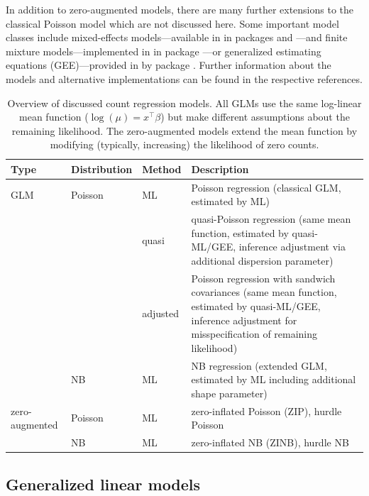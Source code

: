 \documentclass{Z}
\begin{document}
In addition to zero-augmented models, there are many further extensions to
the classical Poisson model which are not discussed here. Some important model
classes include mixed-effects models---available in  in packages
 and  \citep[see][]{countreg:Pinheiro+Bates:2000}---and
finite mixture models---implemented in  in package 
\citep{countreg:Leisch:2004}---or generalized estimating equations
(GEE)---provided in  by package 
\citep{countreg:Halekoh+Hojsgaard+Yan:2006}. Further information about the models
and alternative  implementations can be found in the respective
references.

\begin{table}[b!]
\begin{center}
\begin{tabular}{|l|l|l|p{7.4cm}|}
\hline
Type & Distribution & Method & Description \\ \hline
GLM & Poisson & ML & Poisson regression (classical GLM, estimated by ML) \\
    &         & quasi & quasi-Poisson regression
                        (same mean function, estimated by quasi-ML/GEE,
			 inference adjustment via additional dispersion parameter) \\
    &         & adjusted & Poisson regression with sandwich covariances
                           (same mean function, estimated by quasi-ML/GEE, inference
			   adjustment for misspecification of remaining likelihood) \\
    & NB      & ML    & NB regression
                        (extended GLM, estimated by ML including additional shape parameter) \\ \hline
zero-augmented & Poisson & ML & zero-inflated Poisson (ZIP), hurdle Poisson \\
               & NB      & ML & zero-inflated NB (ZINB), hurdle NB \\ \hline
\end{tabular}
\caption{\label{tab:overview} Overview of discussed count regression models. All GLMs use the
same log-linear mean function ($\log(\mu) = x^\top \beta$) but make different assumptions about
the remaining likelihood. The zero-augmented models extend the mean function by 
modifying (typically, increasing) the likelihood of zero counts.}
\end{center}
\end{table}

\subsection{Generalized linear models}
\end{document}
